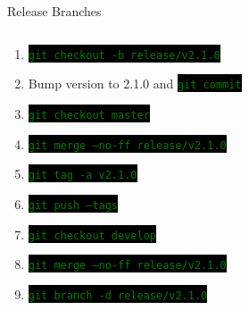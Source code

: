 \documentclass[
14pt,
aspectratio=169,
usenames,
dvipsnames,
x11names]{beamer}
\newcommand{\code}[1]{{\small\colorbox{black}{\textcolor{green}{\texttt{#1}}}}}
\newcommand{\shadowbox}[2]{%
  \hbox{%
    \begin{tcolorbox}[beamer,
      width=#1,
      drop fuzzy shadow=black,
      arc=0pt,
      boxsep=0pt,
      left=0pt,right=0pt,top=0pt,bottom=0pt,
      ]%
      #2
    \end{tcolorbox}
  }
}
\begin{document}
\begin{frame}{Release Branches}
  \begin{columns}
    \begin{column}{.62\linewidth}
      \minipage[c][0.75\textheight][s]{\columnwidth}
      \begin{enumerate} \setlength{\itemsep}{\fill}
      \item \code{git checkout -b release/v2.1.0}
      \item Bump version to 2.1.0 and \code{git commit}
      \item \code{git checkout master}
      \item \code{git merge --no-ff release/v2.1.0}
      \item \code{git tag -a v2.1.0}
      \item \code{git push --tags}
      \item \code{git checkout develop}
      \item \code{git merge --no-ff release/v2.1.0}
      \item \code{git branch -d release/v2.1.0}
      \end{enumerate}
      \endminipage
    \end{column}
\end{columns}
\end{frame}
\end{document}
